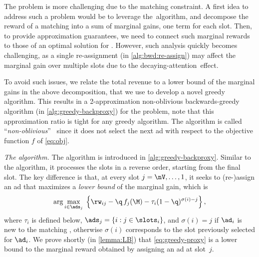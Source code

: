 The \streamads problem is more challenging due to the matching constraint.
A first idea to address such a problem would be to leverage the~\alggback algorithm, 
and decompose the reward of a matching 
into a sum of marginal gains, %
one term for each slot.
Then, 
to provide approximation guarantees, we need to 
connect such marginal rewards to those of an optimal solution for \streamads. %
However, such analysis quickly becomes challenging, 
as a single re-assignment (in \cref{alg:bwd:re-assign}) may affect the marginal gain over multiple slots due to the decaying-attention~effect.

To avoid such issues, we relate the total revenue to a lower bound of the marginal gains in the above decomposition,
that we use to develop a novel greedy algorithm.
%
This results in a 2-approximation 
non-oblivious backwards-greedy algorithm 
(\alggbackproxy in \cref{alg:greedy-backproxy}) 
for the \streamads problem, note that
this approximation ratio is tight for any greedy algorithm.
The \alggbackproxy algorithm is called ``\emph{non-oblivious}''~\citep{khanna1998syntactic} 
since
it does not select the next ad
with respect to the objective function $f$ of \cref{eq:obj}.


\smallskip
\noindent
\emph{The \alggbackproxy algorithm.}
The \alggbackproxy algorithm is introduced in \cref{alg:greedy-backproxy}.
Similar to the \alggback algorithm,
it processes the slots in a reverse order, starting from the final slot.
The key difference is that,
at every slot $j=\nV,\dots,1$, it seeks to (re-)assign an ad that maximizes a \emph{lower bound} of the marginal gain, 
which is
\begin{align}
	\arg\max_{i \in \ads_j} \; \left\{\rw_{ij} - \q \, f_j(\M) - \tau_i (1-\q)^{\sigma(i)-j}\right\}, \label{eq:greedy-proxy}
\end{align}
where 
$\tau_i$ is defined below,
$\ads_j = \{ i: j \in \slots_i \}$, and
$\sigma(i)=j$ %
if $\ad_i$ is new to the matching \M, 
otherwise $\sigma(i)$ corresponds to the slot previously selected for $\ad_i$.
We prove shortly (in \cref{lemma:LB}) that \cref{eq:greedy-proxy} is a lower bound 
to the marginal reward obtained by assigning an ad at slot~$j$. 

